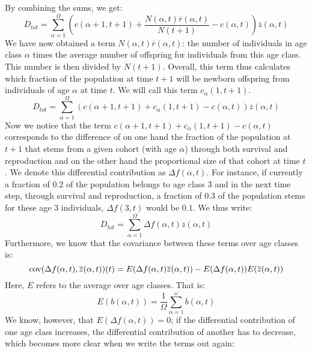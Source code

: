 By combining the sums, we get:
\begin{equation}
D_{tot} = \sum_{\alpha=1}^{\Omega} \left( c(\alpha+1,t+1) + \frac{N(\alpha,t)\overline{r}(\alpha,t)}{N(t+1)}  - c(\alpha,t) \right) \overline{z}(\alpha,t)
\end{equation}
We have now obtained a term $N(\alpha,t)\overline{r}(\alpha,t)$: the number of individuals in age class $\alpha$ times the average number of offspring for individuals from this age class. This number is then divided by $N(t+1)$. Overall, this term thus calculates which fraction of the population at time $t+1$ will be newborn offspring from individuals of age $\alpha$ at time $t$. We will call this term $c_\alpha(1,t+1)$. 
\begin{equation}
D_{tot} = \sum_{\alpha=1}^{\Omega} \left( c(\alpha+1,t+1) + c_\alpha(1,t+1) - c(\alpha,t) \right) \overline{z}(\alpha,t)
\end{equation}
Now we notice that the term $c(\alpha+1,t+1) + c_\alpha(1,t+1) - c(\alpha,t)$ corresponds to the difference of on one hand the fraction of the population at $t+1$ that stems from a given cohort (with age $\alpha$) through both survival and reproduction and on the other hand the proportional size of that cohort at time $t$. We denote this differential contribution as $\Delta f(\alpha,t)$. For instance, if currently a fraction of $0.2$ of the population belongs to age class 3 and in the next time step, through survival and reproduction, a fraction of $0.3$ of the population stems for these age 3 individuals, $\Delta f(3,t)$ would be $0.1$. We thus write:
\begin{equation} \label{demotot}
D_{tot} = \sum_{\alpha=1}^{\Omega} \Delta f(\alpha,t) \overline{z}(\alpha,t)
\end{equation}
Furthermore, we know that the covariance between these terms over age classes is:
\begin{equation} \label{galapagos}
\mathrm{cov}(\Delta f(\alpha,t),\overline{z}(\alpha,t))(t) = E(\Delta f(\alpha,t) \overline{z}(\alpha,t)) - E(\Delta f(\alpha,t))E(\overline{z}(\alpha,t))
\end{equation}
Here, $E$ refers to the average over age classes. That is:
\begin{equation}
E(b(\alpha,t)) = \frac{1}{\Omega}\sum_{\alpha=1}^\omega b(\alpha,t)
\end{equation}
We know, however, that $E(\Delta f(\alpha,t)) = 0$; if the differential contribution of one age class increases, the differential contribution of another has to decrease, which becomes more clear when we write the terms out again:
